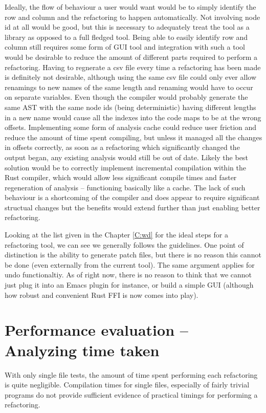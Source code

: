 Ideally, the flow of behaviour a user would want would be to simply identify the row and column and the refactoring to happen automatically. Not involving node id at all would be good, but this is necessary to adequately treat the tool as a library as opposed to a full fledged tool. Being able to easily identify row and column still requires some form of GUI tool and integration with such a tool would be desirable to reduce the amount of different parts required to perform a refactoring. Having to regnerate a csv file every time a refactoring has been made is definitely not desirable, although using the same csv file could only ever allow renamings to new names of the same length and renaming would have to occur on separate variables. Even though the compiler would probably generate the same AST with the same node ids (being deterministic) having different lengths in a new name would cause all the indexes into the code maps to be at the wrong offsets. Implementing some form of analysis cache could reduce user friction and reduce the amount of time spent compiling, but unless it managed all the changes in offsets correctly, as soon as a refactoring which significantly changed the output began, any existing analysis would still be out of date. Likely the best solution would be to correctly implement incremental compilation within the Rust compiler, which would allow less significant compile times and faster regeneration of analysis -- functioning basically like a cache. The lack of such behaviour is a shortcoming of the compiler and does appear to require significant structual changes but the benefits would extend further than just enabling better refactoring.

Looking at the list given in the Chapter \ref{C:wd} for the ideal steps for a refactoring tool, we can see we generally follows the guidelines. One point of distinction is the ability to generate patch files, but there is no reason this cannot be done (even externally from the current tool). The same argument applies for undo functionaltiy. As of right now, there is no reason to think that we cannot just plug it into an Emacs plugin for instance, or build a simple GUI (although how robust and convenient Rust FFI is now comes into play).


\section{Performance evaluation -- Analyzing time taken}\label{S:perfeval}
With only single file tests, the amount of time spent performing each refactoring is quite negligible. Compilation times for single files, especially of fairly trivial programs do not provide sufficient evidence of practical timings for performing a refactoring.

